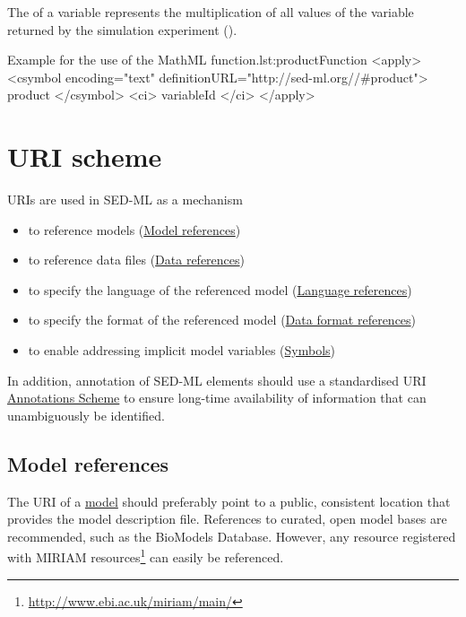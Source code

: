 \subsubsection*{}
\label{fun:product}
The  of a variable represents the multiplication of all values of the variable returned by the simulation experiment ().
\begin{myXmlLst}{Example for the use of the MathML  function.}{lst:productFunction}
<apply>
 	<csymbol encoding="text" definitionURL="http://sed-ml.org//#product">
 		product
 	</csymbol>
 	<ci> variableId </ci>
</apply>
\end{myXmlLst}
  
  
\section{URI scheme}  
\label{sec:uriScheme}
URIs are used in SED-ML as a mechanism
\begin{itemize}
	\item to reference models (\hyperref[sec:modelURI]{Model references})
	\item to reference data files (\hyperref[sec:dataURI]{Data references})
	\item to specify the language of the referenced model (\hyperref[sec:languageURI]{Language references})
	\item to specify the format of the referenced model (\hyperref[sec:dataFormatURI]{Data format references})
	\item to enable addressing implicit model variables (\hyperref[sec:implicitVariable]{Symbols})
\end{itemize}

In addition, annotation of SED-ML elements should use a standardised URI \hyperref[sec:annotations]{Annotations Scheme} to ensure long-time availability of information that can unambiguously be identified.


\subsection{Model references}
\label{sec:modelURI}
The URI of a \hyperref[class:model]{model} should preferably point to a public, consistent location that provides the model description file. References to curated, open model bases are recommended, such as the BioModels Database. However, any resource registered with MIRIAM resources\footnote{\url{http://www.ebi.ac.uk/miriam/main/}} can easily be referenced.

